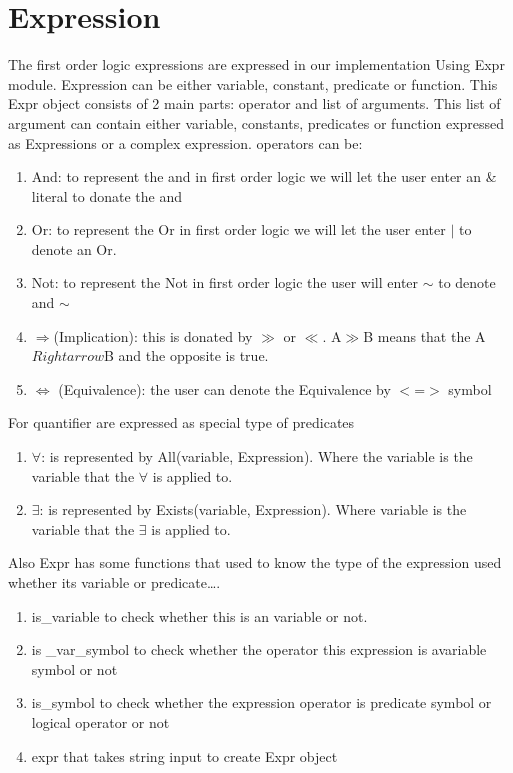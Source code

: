 \label{chap:assign1}{}
\section{Expression}
The first order logic expressions are expressed in our implementation Using Expr
module. Expression can be either variable, constant, predicate or function. 
This Expr object consists of 2 main parts: operator and list of arguments. This
list of argument can contain either variable, constants, predicates or function
expressed as Expressions or a complex expression. operators can be:
\begin{enumerate}
\item{And: to represent the and in first order logic we will let the user enter an \& literal to donate the and}
\item{Or: to represent the Or in first order logic we will let the user enter $\mid$ to denote an Or.}
\item{Not: to represent the Not in first order logic the user will enter $\sim$ to denote and $\sim$}
\item{$\Rightarrow$(Implication): this is donated by $\gg$ or $\ll$. A$\gg$B means that the A $Rightarrow$B and the opposite is true.}
\item{$\Leftrightarrow$ (Equivalence): the user can denote the Equivalence by $<$=$>$ symbol}
\end{enumerate}

For quantifier are expressed as special type of predicates 
\begin{enumerate}
\item{$\forall$: is represented by All(variable, Expression). Where the variable is the variable that the $\forall$ is applied to.}
\item{$\exists$: is represented by Exists(variable, Expression). Where variable is the variable that the $\exists$ is applied to.}
\end{enumerate}

Also Expr has some functions that used to know the type of the expression used
whether its variable or predicate\ldots . 
\begin{enumerate}
\item is\_variable to check whether this is an variable or not.
\item is \_var\_symbol to check whether the operator this expression is
avariable symbol or not
\item is\_symbol to check whether the expression operator is predicate symbol or
logical operator or not
\item expr that takes string input to create Expr object
\end{enumerate}

